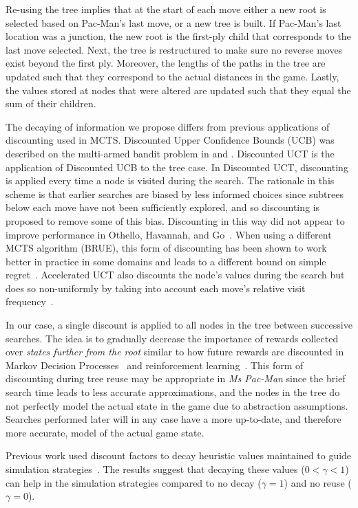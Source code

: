 \documentclass[journal]{IEEEtran}
\begin{document}
Re-using the tree implies that at the start of each move either a new root is selected based on Pac-Man's last move, or a new tree is built. If Pac-Man's last location was a junction, the new root is the first-ply child that corresponds to the last move selected. Next, the tree is restructured to make sure no reverse moves exist beyond the first ply. Moreover, the lengths of the paths in the tree are updated such that they correspond to the actual distances in the game. Lastly, the values stored at nodes that were altered are updated such that they equal the sum of their children.

The decaying of information we propose differs from previous applications of discounting used in MCTS. Discounted Upper Confidence Bounds (UCB) was described on the multi-armed bandit problem in \cite{Kocsis06ducb} and \cite{Garivier11On}. Discounted UCT is the application of Discounted UCB to the tree case. In Discounted UCT, discounting is applied every time a node is visited during the search. The rationale in this scheme is that earlier searches are biased by less informed choices since subtrees below each move have not been sufficiently explored, and so discounting is proposed to remove some of this bias. Discounting in this way did not appear to improve performance in Othello, Havannah, and Go~\cite{Hashimoto12Accelerated}. When using a different MCTS algorithm (BRUE), this form of discounting has been shown to work better in practice in some domains and leads to a different bound on simple regret~\cite{Feldman12Simple}. Accelerated UCT also discounts the node's values during the search but does so non-uniformly by taking into account each move's relative visit frequency~\cite{Hashimoto12Accelerated}. 

In our case, a single discount is applied to all nodes in the tree between successive searches. The idea is to gradually decrease the importance of rewards collected over {\it states further from the root} similar to how future rewards are discounted in Markov Decision Processes~\cite{Bertsekas12MDPbook} and reinforcement learning~\cite{sutton1998reinforcement}. This form of discounting during tree reuse may be appropriate in {\it{Ms Pac-Man}} since the brief search time leads to less accurate approximations, and the nodes in the tree do not perfectly model the actual state in the game due to abstraction assumptions. Searches performed later will in any case have a more up-to-date, and therefore more accurate, model of the actual game state.

Previous work used discount factors to decay heuristic values maintained to guide simulation strategies~\cite{tak13decaying}. The results suggest that decaying these values ($0 < \gamma < 1$) can help in the simulation strategies compared to no decay ($\gamma = 1$) and no reuse ($\gamma = 0$).
\end{document}
